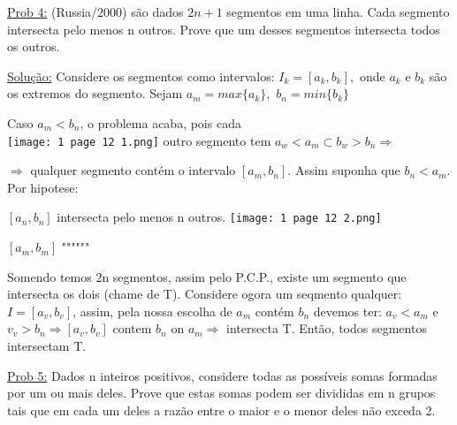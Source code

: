 \documentclass[a4paper,12pt]{article}
\theoremstyle{plain} %
\theoremstyle{definition} %
\theoremstyle{remark} %
\begin{document}
	\vspace{2ex}\underline{Prob 4:} (Russia/2000) s\~ao dados $2n+1$ segmentos em uma linha. Cada segmento intersecta pelo menos n outros. Prove que um desses segmentos intersecta todos os outros.
	
	\begin{framed}
		\underline{Solu\c{c}\~ao:} Considere os segmentos como intervalos: $I_k=[a_k,b_k],$ onde $a_k$ e $b_k$ s\~ao os extremos do segmento. Sejam $a_m=max\{a_k\},$ $b_n=min\{b_k\}$
		
		Caso $a_m<b_n$, o problema acaba, pois cada\\
		
		\texttt{[image: 1 page 12 1.png]} outro segmento tem $a_w<a_m\subset b_w>b_n \Rightarrow$
		
		$\Rightarrow$ qualquer segmento cont\'em o intervalo $[a_m,b_n].$ Assim suponha que $b_n<a_m$. Por hipotese:
		
		\textasteriskcentered $[a_n, b_n]$ intersecta pelo menos n outros. \texttt{[image: 1 page 12 2.png]}
		
		\textasteriskcentered $[a_m, b_m]$ "\hspace{2em}"\hspace{2em}"\hspace{2em}"\hspace{2em}"\hspace{2em}"
		
		Somendo temos 2n segmentos, assim pelo P.C.P., existe um segmento que intersecta os dois (chame de T). Considere ogora um seqmento qualquer: $I=[a_v,b_v]$, assim, pela nossa escolha de $a_m$
		cont\'em $b_n$ devemos ter: $a_v<a_m$ e $v_v>b_n\Rightarrow [a_v,b_v]$ contem $b_n$ on $a_m\Rightarrow$ intersecta T. Ent\~ao, todos segmentos intersectam T. \tiny\textblock
	\end{framed}
	
	\normalsize
	
	\vspace{2ex}\underline{Prob 5:} Dados n inteiros positivos, considere todas as poss\'iveis somas formadas por um ou mais deles. Prove que estas somas podem ser divididas em n grupos tais que em cada um deles a raz\~ao entre o maior e o menor deles n\~ao exceda 2.
	
\end{document}
